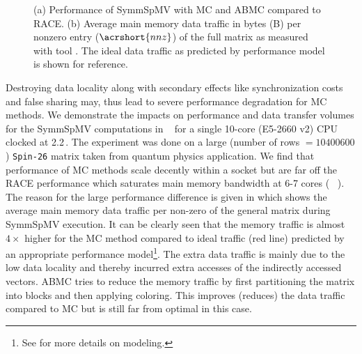 \begin{figure}[b]
	\hspace{0.5em}
	\caption{\label{fig:motivation}(a) Performance of \acrshort{SymmSpMV} with 
		\acrshort{MC} and \acrshort{ABMC} compared to \acrshort{RACE}. 
		(b) Average main memory data traffic in bytes (B) per nonzero entry ($\acrshort{nnz}$) 
		of the full matrix as measured with \LIKWID tool \cite{LIKWID}. The ideal data traffic
		as predicted by performance model is shown for reference.}
\end{figure}


Destroying data locality along with secondary effects like 
synchronization costs and false sharing may, thus lead to severe performance degradation for MC methods.
We demonstrate the impacts on performance and 
data transfer volumes for the \acrshort{SymmSpMV} computations in ~ for a single 10-core  \Intel \IVB (E5-2660 v2) CPU clocked at 2.2\,\GHZ.
The experiment was done on a large (number of rows $= 10400600$) \texttt{Spin-26} \cite{Spin} matrix taken from quantum physics application. 
We find that performance of MC methods scale decently within a socket but are far off the RACE performance which saturates main memory bandwidth at 6-7 cores (~ ).
The reason for the large performance difference is given in  which shows the average main memory data traffic per non-zero  of the 
general matrix during \acrshort{SymmSpMV} execution. It can be clearly seen that 
the memory traffic is almost  $4 \times$ higher 
for the \acrshort{MC} method compared to ideal traffic (red line) predicted
by an appropriate performance model\footnote{See  for more details on modeling.}.
The extra data traffic is mainly due to the low data locality and thereby incurred 
extra accesses of the indirectly accessed vectors. 
\Acrfull{ABMC} tries to reduce the memory traffic by first partitioning the matrix
into blocks and then applying coloring. This improves (reduces) the data traffic compared 
to \acrshort{MC} but is still far from optimal in this case. 

